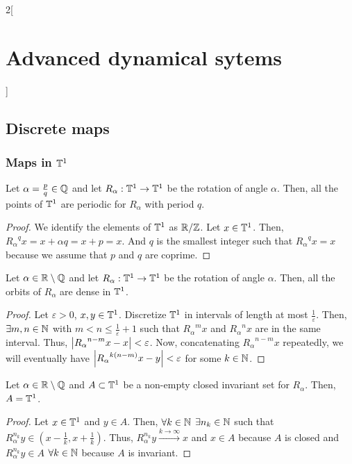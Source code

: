 \documentclass[../../../main_math.tex]{subfiles}
\begin{document}
\begin{multicols}{2}[\section{Advanced dynamical sytems}]
  \subsection{Discrete maps}
  \subsubsection{Maps in \texorpdfstring{$\mathbb{T}^1$}{S1}}
  \begin{proposition}
    Let $\alpha=\frac{p}{q}\in\mathbb{Q}$ and let $R_\alpha:\mathbb{T}^1\to \mathbb{T}^1$ be the rotation of angle $\alpha$. Then, all the points of $\mathbb{T}^1$ are periodic for $R_\alpha$ with period $q$.
  \end{proposition}
  \begin{proof}
    We identify the elements of $\mathbb{T}^1$ as $\quot{\RR}{\ZZ}$. Let $x\in \mathbb{T}^1$. Then, ${R_\alpha}^q x=x+\alpha q=x+p=x$. And $q$ is the smallest integer such that ${R_\alpha}^q x=x$ because we assume that $p$ and $q$ are coprime.
  \end{proof}
  \begin{proposition}
    Let $\alpha\in\mathbb{R}\setminus\mathbb{Q}$ and let $R_\alpha:\mathbb{T}^1\to \mathbb{T}^1$ be the rotation of angle $\alpha$. Then, all the orbits of $R_\alpha$ are dense in $\mathbb{T}^1$.
  \end{proposition}
  \begin{proof}
    Let $\varepsilon>0$, $x,y\in \mathbb{T}^1$. Discretize $\mathbb{T}^1$ in intervals of length at most $\frac{1}{\varepsilon}$. Then, $\exists m,n\in \mathbb{N}$ with $m< n\leq \frac{1}{\varepsilon}+1$ such that ${R_\alpha}^m x$ and ${R_\alpha}^nx$ are in the same interval. Thus, $\abs{{R_\alpha}^{n-m}x-x}<\varepsilon$. Now, concatenating ${R_\alpha}^{n-m}x$ repeatedly, we will eventually have $\abs{{R_\alpha}^{k(n-m)}x - y}<\varepsilon$ for some $k\in \mathbb{N}$.
  \end{proof}
  \begin{corollary}
    Let $\alpha\in\mathbb{R}\setminus\mathbb{Q}$ and $A\subset \mathbb{T}^1$ be a non-empty closed invariant set for $R_\alpha$. Then, $A=\mathbb{T}^1$.
  \end{corollary}
  \begin{proof}
    Let $x\in \mathbb{T}^1$ and $y\in A$. Then, $\forall k\in\mathbb{N}$ $\exists n_k\in\mathbb{N}$ such that $R_\alpha^{n_k}y\in(x-\frac{1}{k},x+\frac{1}{k})$. Thus, $R_\alpha^{n_k}y\overset{k\to\infty}{\longrightarrow}x$ and $x\in A$ because $A$ is closed and $R_\alpha^{n_k}y\in A$ $\forall k\in\mathbb{N}$ because $A$ is invariant.

\end{proof}
\end{multicols}
\end{document}

